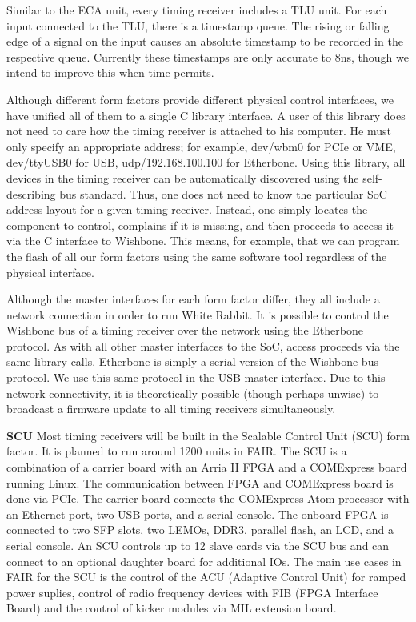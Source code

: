 Similar to the ECA unit,
every timing receiver includes a TLU unit.
For each input connected to the TLU, 
there is a timestamp queue.
The rising or falling edge of a signal on the input
causes an absolute timestamp to be recorded in the 
respective queue.
Currently these timestamps are only accurate to 8ns,
though we intend to improve this when time permits.

Although different form factors provide different physical control interfaces, 
we have unified all of them to a single C library interface.
A user of this library does not need to care how the timing 
receiver is attached to his computer.
He must only specify an appropriate address;
for example,
dev/wbm0 for PCIe or VME,
dev/ttyUSB0 for USB,
udp/192.168.100.100 for Etherbone.
Using this library, all devices in the timing receiver
can be automatically discovered using the self-describing bus standard.
Thus, one does not need to know the particular SoC address layout
for a given timing receiver.
Instead, one simply locates the component to control,
complains if it is missing,
and then proceeds to access it via the C interface to Wishbone.
This means, for example, 
that we can program the flash of all our form factors using the same 
software tool regardless of the physical interface.

Although the master interfaces for each form factor differ,
they all include a network connection in order to run White Rabbit.
It is possible to control the Wishbone bus of a timing receiver over
the network using the Etherbone protocol.
As with all other master interfaces to the SoC,
access proceeds via the same library calls.
Etherbone is simply a serial version of the Wishbone bus protocol.
We use this same protocol in the USB master interface.
Due to this network connectivity,
it is theoretically possible (though perhaps unwise)
to broadcast a firmware update to all timing receivers simultaneously.

\textbf{SCU}
Most timing receivers will be built in the 
Scalable Control Unit (SCU) form factor.
It is planned to run around 1200 units in FAIR.
The SCU is a combination of a carrier board with an Arria II FPGA and a
COMExpress board running Linux.
The communication between FPGA and COMExpress board is done via PCIe.
The carrier board connects the COMExpress Atom processor with
an Ethernet port, two USB ports, and a serial console.
The onboard FPGA is connected to two SFP slots, two LEMOs, DDR3, 
parallel flash, an LCD, and a serial console.
An SCU controls up to 12 slave cards via the SCU bus
and can connect to an optional daughter board for additional IOs.
The main use cases in FAIR for the SCU is the control of the ACU
(Adaptive Control Unit) for ramped power suplies,
control of radio frequency devices with FIB (FPGA Interface Board) and
the control of kicker modules via MIL extension board.

